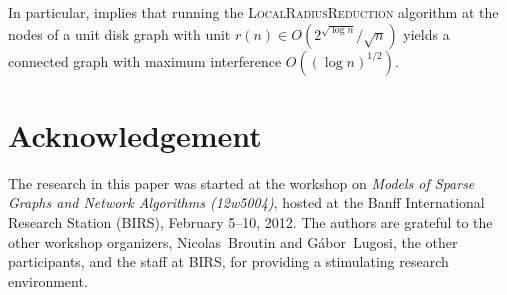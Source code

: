 \documentclass{patmorin}
\begin{document}
In particular,  implies that running the
\textsc{LocalRadiusReduction} algorithm at the nodes of a unit disk graph
with unit $r(n)\in O(2^{\sqrt{\log n}}/\sqrt{n})$ yields a connected
graph with maximum interference $O((\log n)^{1/2})$.


\section*{Acknowledgement}

The research in this paper was started at the workshop on \emph{Models
of Sparse Graphs and Network Algorithms (12w5004)}, hosted at the Banff
International Research Station (BIRS), February 5--10, 2012.  The authors
are grateful to the other workshop organizers, Nicolas~Broutin and
G\'abor~Lugosi, the other participants, and the staff at BIRS, for
providing a stimulating research environment.



\end{document}
